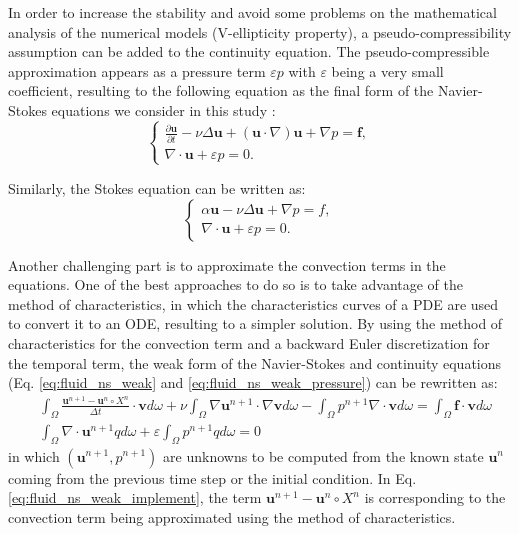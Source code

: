 In order to increase the stability and avoid some problems on the mathematical analysis of the numerical models (V-ellipticity
property), a pseudo-compressibility assumption can be added to the continuity equation. The pseudo-compressible approximation appears as a pressure term $\varepsilon p$ with $\varepsilon$ being a very small coefficient, resulting to the following equation as the final form of the Navier-Stokes equations we consider in this study \cite{devuyst2013}:
\begin{equation}  \label{eq:fluid_ns_pseudo}
\left\{ {\begin{array}{*{20}{l}}
\displaystyle  {\frac{{\partial {\mathbf{u}}}}{{\partial t}} - \nu\Delta{\mathbf{u}} + \left( {{\mathbf{u}} \cdot \nabla } \right) {\mathbf{u}} + \nabla p = {\mathbf{f}},} \\ 
 \displaystyle {\nabla\cdot{\mathbf{u}} + \varepsilon p = 0.} 
\end{array}} \right.
\end{equation}

Similarly, the Stokes equation can be written as:
\begin{equation} \label{eq:fluid_stokes_pseudo}
\left\{ {\begin{array}{*{20}{l}}
\displaystyle  {\alpha \mathbf{u} - \nu\Delta \mathbf{u} + \nabla p = f,} \\ 
\displaystyle  {\nabla\cdot\mathbf{u} + \varepsilon p = 0.}
\end{array}} \right.
\end{equation}

Another challenging part is to approximate the convection terms in the equations. One of the best approaches to do so is to take advantage of the method of characteristics, in which the characteristics curves of a PDE are used to convert it to an ODE, resulting to a simpler solution. By using the method of characteristics for the convection term and a backward Euler discretization for the temporal term, the weak form of the Navier-Stokes and continuity equations (Eq. \ref{eq:fluid_ns_weak} and \ref{eq:fluid_ns_weak_pressure}) can be rewritten as:
\begin{equation} \label{eq:fluid_ns_weak_implement}
\begin{aligned}
&\int_{\Omega} \frac{\mathbf{u}^{n+1}-\mathbf{u}^{n} \circ X^{n}}{\Delta t} \cdot \mathbf{v} d \omega+\nu \int_{\Omega} \nabla \mathbf{u}^{n+1} \cdot \nabla \mathbf{v} d \omega-\int_{\Omega} p^{n+1} \nabla \cdot \mathbf{v} d \omega=\int_{\Omega} \boldsymbol{f} \cdot \mathbf{v} d\omega \\
&\int_{\Omega} \nabla \cdot \mathbf{u}^{n+1} q d \omega+\varepsilon \int_{\Omega} p^{n+1} q d \omega=0
\end{aligned}
\end{equation}
in which $(\mathbf{u}^{n+1},p^{n+1})$ are unknowns to be computed from the known state $\mathbf{u}^{n}$ coming from the previous time step or the initial condition. In Eq. \ref{eq:fluid_ns_weak_implement}, the term $\mathbf{u}^{n+1}-\mathbf{u}^{n} \circ X^{n}$ is corresponding to the convection term being approximated using the method of characteristics.

